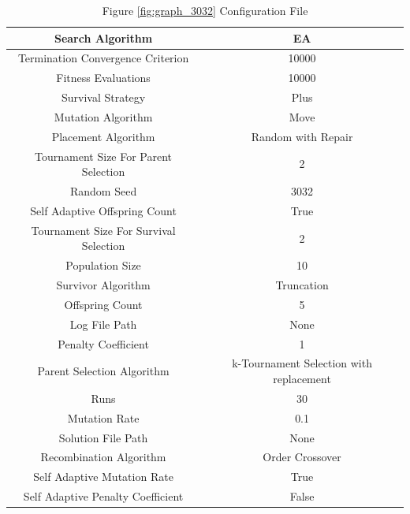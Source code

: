 \documentclass{standalone}
\begin{document}
\begin{table}[!htb]
	\centering
	\caption{Figure \ref{fig:graph_3032} Configuration File}
	\label{tab:graph_3032}
	\begin{tabular}{| c | c |}
		\hline
		Search Algorithm		& EA		 \\
		\hline
		Termination Convergence Criterion		& 10000		 \\
		\hline
		Fitness Evaluations		& 10000		 \\
		\hline
		Survival Strategy		& Plus		 \\
		\hline
		Mutation Algorithm		& Move		 \\
		\hline
		Placement Algorithm		& Random with Repair		 \\
		\hline
		Tournament Size For Parent Selection		& 2		 \\
		\hline
		Random Seed		& 3032		 \\
		\hline
		Self Adaptive Offspring Count		& True		 \\
		\hline
		Tournament Size For Survival Selection		& 2		 \\
		\hline
		Population Size		& 10		 \\
		\hline
		Survivor Algorithm		& Truncation		 \\
		\hline
		Offspring Count		& 5		 \\
		\hline
		Log File Path		& None		 \\
		\hline
		Penalty Coefficient		& 1		 \\
		\hline
		Parent Selection Algorithm		& k-Tournament Selection with replacement		 \\
		\hline
		Runs		& 30		 \\
		\hline
		Mutation Rate		& 0.1		 \\
		\hline
		Solution File Path		& None		 \\
		\hline
		Recombination Algorithm		& Order Crossover		 \\
		\hline
		Self Adaptive Mutation Rate		& True		 \\
		\hline
		Self Adaptive Penalty Coefficient		& False		 \\
		\hline
	\end{tabular}
\end{table}
\end{document}
